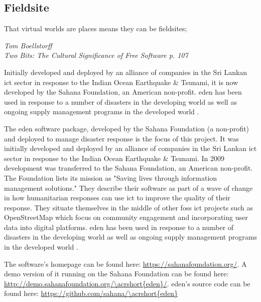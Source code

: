 \documentclass[a4paper,man,natbib]{apa6}
\begin{document}
   \subsection*{Fieldsite}
   \epigraph{That virtual worlds are places means they can be fieldsites;}{\textit{Tom Boellstorff \\ Two Bits: The Cultural Significance of Free Software p. 107}}

   Initially developed and deployed by an alliance of companies in the Sri Lankan \acrfull{ict} sector in response to the Indian Ocean Earthquake \& Tsunami, it is now developed by the Sahana Foundation, an American non-profit. \acrshort{eden} has been used in response to a number of disasters in the developing world as well as ongoing supply management programs in the developed world \citep{Sahana_Foundation_undated-hl}. 

   The \acrfull{eden} software package, developed by the Sahana Foundation (a non-profit) and deployed to manage disaster response is the focus of this project. It was initially developed and deployed by an alliance of companies in the Sri Lankan \acrfull{ict} sector in response to the Indian Ocean Earthquake \& Tsunami. In 2009 development was transferred to the Sahana Foundation, an American non-profit. The Foundation lists its mission as "Saving lives through information management solutions." They describe their software as part of a wave of change in how humanitarian responses can use \acrshort{ict} to improve the quality of their response. They situate themselves in the middle of other \acrfull{foss} \acrshort{ict} projects such as \Gls{OpenStreetMap} which focus on community engagement and incorporating user data into digital platforms. \acrshort{eden} has been used in response to a number of disasters in the developing world as well as ongoing supply management programs in the developed world \citep{Sahana_Foundation_undated-hl}.

   The software's homepage can be found here: \url{https://sahanafoundation.org/}. \linebreak 
   A demo version of it running on the Sahana Foundation can be found here: \url{http://demo.sahanafoundation.org/\acrshort{eden}/}. \linebreak 
   \acrshort{eden}'s source code can be found here: \url{https://github.com/sahana/\acrshort{eden}} \linebreak 
\end{document}
